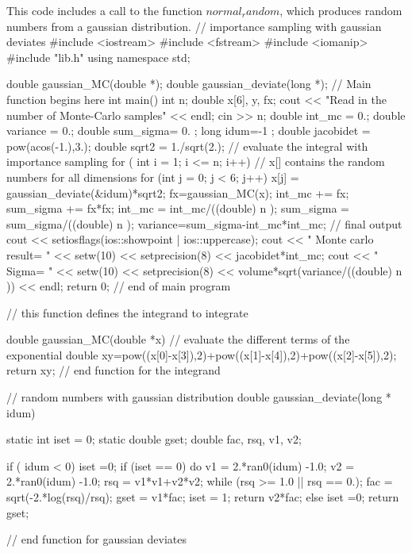 \documentclass[%
oneside,                 %
final,                   %
10pt]{article}
\newenvironment{block_mdfboxadmon}[1][]{
\begin{block_mdfboxmdframed}[frametitle=#1]
}
{
\end{block_mdfboxmdframed}
}
\begin{document}
\begin{block_mdfboxadmon}[]
This code includes a call to the function $normal_random$, which produces
random numbers from a gaussian distribution. 
\bcppcod
// importance sampling with gaussian deviates
#include <iostream>
#include <fstream>
#include <iomanip>
#include "lib.h"
using namespace std;

double gaussian_MC(double *);
double gaussian_deviate(long *);
//     Main function begins here     
int main()
{
     int n;
     double x[6], y, fx; 
     cout << "Read in the number of Monte-Carlo samples" << endl;
     cin >> n;
     double int_mc = 0.;  double variance = 0.;
     double sum_sigma= 0. ; long idum=-1 ;  
     double jacobidet = pow(acos(-1.),3.);
     double sqrt2 = 1./sqrt(2.);
//   evaluate the integral with importance sampling    
     for ( int i = 1;  i <= n; i++){
//   x[] contains the random numbers for all dimensions
       for (int j = 0; j < 6; j++) {
	 x[j] = gaussian_deviate(&idum)*sqrt2;
       }
       fx=gaussian_MC(x); 
       int_mc += fx;
       sum_sigma += fx*fx;
     }
     int_mc = int_mc/((double) n );
     sum_sigma = sum_sigma/((double) n );
     variance=sum_sigma-int_mc*int_mc;
//   final output 
      cout << setiosflags(ios::showpoint | ios::uppercase);
      cout << " Monte carlo result= " << setw(10) << setprecision(8) << jacobidet*int_mc;
      cout << " Sigma= " << setw(10) << setprecision(8) << volume*sqrt(variance/((double) n )) << endl;
     return 0;
}  // end of main program 

// this function defines the integrand to integrate 
 
double  gaussian_MC(double *x) 
{
// evaluate the different terms of the exponential
   double xy=pow((x[0]-x[3]),2)+pow((x[1]-x[4]),2)+pow((x[2]-x[5]),2);
   return xy;
} // end function for the integrand

// random numbers with gaussian distribution
double gaussian_deviate(long * idum)
{
  static int iset = 0;
  static double gset;
  double fac, rsq, v1, v2;

  if ( idum < 0) iset =0;
  if (iset == 0) {
    do {
      v1 = 2.*ran0(idum) -1.0;
      v2 = 2.*ran0(idum) -1.0;
      rsq = v1*v1+v2*v2;
    } while (rsq >= 1.0 || rsq == 0.);
    fac = sqrt(-2.*log(rsq)/rsq);
    gset = v1*fac;
    iset = 1;
    return v2*fac;
  } else {
    iset =0;
    return gset;
  }
} // end function for gaussian deviates
\ecppcod
\end{block_mdfboxadmon} %
\end{document}
